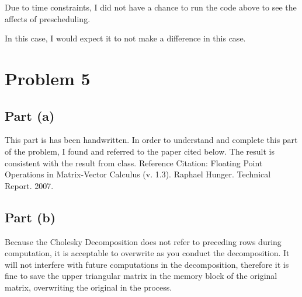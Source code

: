 \documentclass{article}\usepackage[]{graphicx}\usepackage[]{color}
\begin{document}
Due to time constraints, I did not have a chance to run the code above to see the affects of prescheduling.
\par In this case, I would expect it to not make a difference in this case.
\section{Problem 5}
\subsection{Part (a)}
This part is has been handwritten.  In order to understand and complete this part of the problem,  I found and referred to the paper cited below.  The result is consistent with the result from class.
\newline
\newline
Reference Citation: Floating Point Operations in Matrix-Vector Calculus (v. 1.3). Raphael Hunger. Technical Report. 2007.
\subsection{Part (b)}
Because the Cholesky Decomposition does not refer to preceding rows during computation, it is acceptable to overwrite as you conduct the decomposition.  It will not interfere with future computations in the decomposition, therefore it is fine to save the upper triangular matrix in the memory block of the original matrix, overwriting the original in the process.
\end{document}
